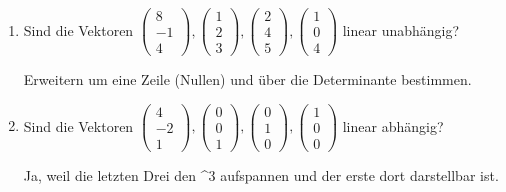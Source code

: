 \documentclass[12pt,a4paper]{scrreprt}
\newcommand{\R}{\mathds{R}}
\begin{document}
\begin{enumerate}
	\item Sind die Vektoren $\begin{pmatrix}
		8 \\ -1 \\ 4
	\end{pmatrix}, \begin{pmatrix}
		1 \\ 2 \\ 3
	\end{pmatrix}, \begin{pmatrix}
		2 \\ 4 \\ 5
	\end{pmatrix}, \begin{pmatrix}
		1 \\ 0 \\ 4
	\end{pmatrix}$ 
	linear unabhängig?
	
	Erweitern um eine Zeile (Nullen) und über die Determinante bestimmen.

	\item Sind die Vektoren $\begin{pmatrix}
		4 \\ -2 \\ 1
	\end{pmatrix}, \begin{pmatrix}
		0 \\ 0 \\ 1
	\end{pmatrix}, \begin{pmatrix}
		0 \\ 1 \\ 0
	\end{pmatrix}, \begin{pmatrix}
		1 \\ 0 \\ 0 
	\end{pmatrix}$ 
	linear abhängig?
	
	Ja, weil die letzten Drei den \R^3 aufspannen und der erste dort darstellbar ist.
\end{enumerate}
\end{document}
